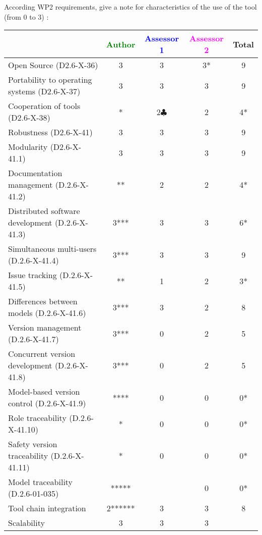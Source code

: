 According WP2 requirements, give a note for characteristics of the use of the tool (from 0 to 3) :

\begin{tabular}{|l | c | c | c | c|}
\hline
& \textcolor{green}{Author} & \textcolor{blue}{Assessor 1} & \textcolor{magenta}{Assessor 2} & Total \\
\hline
Open Source (D2.6-X-36) &3 &3 &3* & 9 \\
\hline
Portability to operating systems (D2.6-X-37) &3 &3 &3 & 9 \\
\hline
Cooperation of tools (D2.6-X-38) &* &2$\clubsuit$ &2 & 4* \\
\hline
Robustness (D2.6-X-41) &3 &3 &3 & 9 \\
\hline
Modularity (D2.6-X-41.1) &3 &3 &3 & 9 \\
\hline
Documentation management (D.2.6-X-41.2) &** &2 &2 & 4* \\
\hline
Distributed software development (D.2.6-X-41.3) &3*** &3 &3 & 6* \\
\hline
Simultaneous multi-users (D.2.6-X-41.4) &3*** & 3&3 & 9 \\
\hline
Issue tracking (D.2.6-X-41.5) &** &1 &2 & 3* \\
\hline
Differences between models (D.2.6-X-41.6) &3*** &3 &2 & 8 \\
\hline
Version management (D.2.6-X-41.7) &3*** &0 &2 & 5 \\
\hline
Concurrent version development (D.2.6-X-41.8) &3*** &0 &2 & 5 \\
\hline
Model-based version control (D.2.6-X-41.9) &**** &0 &0 & 0* \\
\hline
Role traceability (D.2.6-X-41.10) &* &0 &0 & 0* \\
\hline
Safety version traceability (D.2.6-X-41.11) &* &0 &0 & 0* \\
\hline
Model traceability (D.2.6-01-035) &***** & &0 & 0* \\
\hline
Tool chain integration &2****** &3 &3 & 8 \\
\hline
Scalability &3 &3 &3 & \\
\hline
\end{tabular}

